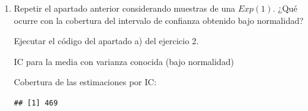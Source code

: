 \documentclass[]{book}
\newenvironment{Shaded}{\begin{snugshade}}{\end{snugshade}}
\newcommand{\KeywordTok}[1]{\textcolor[rgb]{0.13,0.29,0.53}{\textbf{#1}}}
\newcommand{\DecValTok}[1]{\textcolor[rgb]{0.00,0.00,0.81}{#1}}
\newcommand{\FloatTok}[1]{\textcolor[rgb]{0.00,0.00,0.81}{#1}}
\newcommand{\StringTok}[1]{\textcolor[rgb]{0.31,0.60,0.02}{#1}}
\newcommand{\CommentTok}[1]{\textcolor[rgb]{0.56,0.35,0.01}{\textit{#1}}}
\newcommand{\OperatorTok}[1]{\textcolor[rgb]{0.81,0.36,0.00}{\textbf{#1}}}
\newcommand{\NormalTok}[1]{#1}
\theoremstyle{definition}
\theoremstyle{definition}
\theoremstyle{definition}
\theoremstyle{remark}
\begin{document}
 \vspace{0.5cm}

\begin{enumerate}
\def\labelenumi{\alph{enumi})}
\setcounter{enumi}{1}
\item
  Repetir el apartado anterior considerando muestras de una \(Exp(1)\).
  ¿Qué ocurre con la cobertura del intervalo de confianza obtenido bajo
  normalidad?

  Ejecutar el código del apartado a) del ejercicio 2.

  IC para la media con varianza conocida (bajo normalidad)

\begin{Shaded}
\end{Shaded}

  Cobertura de las estimaciones por IC:

\begin{Shaded}
\end{Shaded}

\begin{verbatim}
## [1] 469
\end{verbatim}


\end{enumerate}
\end{document}
